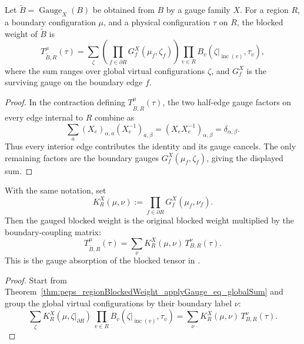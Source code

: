 \begin{theorem}
    \label{thm:peps_regionBlockedWeight_applyGauge_eq_globalSum}
    \leanok
    Let $\widetilde B=\operatorname{Gauge}_X(B)$ be obtained from $B$ by a gauge
    family $X$.  For a region $R$, a boundary configuration $\mu$, and a
    physical configuration $\tau$ on $R$, the blocked weight of $\widetilde B$
    is
    \[
        T_{\widetilde B,R}^{\mu}(\tau)
        =
        \sum_{\zeta}
        \left(
        \prod_{f\in\partial R}G_f^X(\mu_f,\zeta_f)
        \right)
        \prod_{v\in R}B_v(\zeta|_{\operatorname{inc}(v)},\tau_v),
    \]
    where the sum ranges over global virtual configurations $\zeta$, and
    $G_f^X$ is the surviving gauge on the boundary edge $f$.
\end{theorem}
\begin{proof}\leanok
    In the contraction defining $T_{\widetilde B,R}^{\mu}(\tau)$, the two
    half-edge gauge factors on every edge internal to $R$ combine as
    \[
        \sum_a (X_e)_{\alpha,a}(X_e^{-1})_{a,\beta}
        =
        (X_eX_e^{-1})_{\alpha,\beta}
        =
        \delta_{\alpha,\beta}.
    \]
    Thus every interior edge contributes the identity and its gauge cancels.
    The only remaining factors are the boundary gauges
    $G_f^X(\mu_f,\zeta_f)$, giving the displayed sum.
\end{proof}

\begin{theorem}
    \label{thm:peps_regionBlockedWeight_applyGauge}
    \leanok
    With the same notation, set
    \[
        K_R^X(\mu,\nu)
        :=
        \prod_{f\in\partial R}G_f^X(\mu_f,\nu_f).
    \]
    Then the gauged blocked weight is the original blocked weight multiplied by
    the boundary-coupling matrix:
    \[
        T_{\widetilde B,R}^{\mu}(\tau)
        =
        \sum_{\nu}K_R^X(\mu,\nu)\,T_{B,R}^{\nu}(\tau).
    \]
    This is the gauge absorption of the blocked tensor in
    \cite[Section~3, proof of Theorem~3]{Molnar2018NormalPEPS}.
\end{theorem}
\begin{proof}\leanok
    Start from Theorem~\ref{thm:peps_regionBlockedWeight_applyGauge_eq_globalSum}
    and group the global virtual configurations by their boundary label $\nu$:
    \[
        \sum_{\zeta}
        K_R^X(\mu,\zeta|_{\partial R})\,
        \prod_{v\in R}B_v(\zeta|_{\operatorname{inc}(v)},\tau_v)
        =
        \sum_{\nu}K_R^X(\mu,\nu)\,T_{B,R}^{\nu}(\tau).
    \]
\end{proof}

